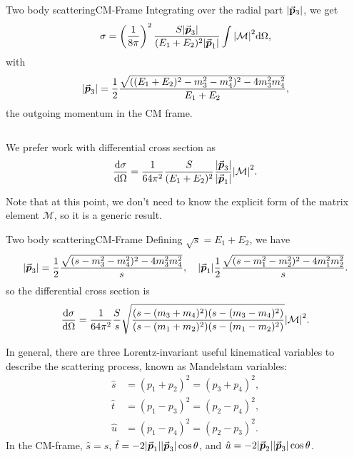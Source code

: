 \documentclass{../bredelebeamer}
\begin{document}
\begin{frame}{Two body scattering}{CM-Frame}
    Integrating over the radial part $\abs{\va p_3}$, we get
    \begin{equation}
        \sigma = \left(\frac{1}{8\pi}\right)^2 \frac{S |\va*{p}_3|}{(E_1 +E_2)^2 \abs{\va*{p}_1}} \int \abs{\mathcal{M}}^2 \dd\Omega,
    \end{equation}
    with 
    \begin{equation}
        |\va*{p}_3| = \frac{1}{2} \frac{\sqrt{((E_1+E_2)^2 - m_3^2 -m_4^2)^2- 4m^2_3m^2_4} }{E_1+E_2},
    \end{equation}
    the outgoing momentum in the CM frame.

    $$ $$

    We prefer work with differential cross section as
    \begin{equation}
        \frac{\dd \sigma}{\dd \Omega} = \frac{1}{64\pi^2} \frac{S }{(E_1 +E_2)^2 } \frac{|\va*{p}_3|}{\abs{\va*{p}_1}} \abs{\mathcal{M}}^2.
    \end{equation}
   

    Note that at this point, we don't need to know the explicit form of the matrix element $\mathcal{M}$, so it is a generic result.
\end{frame}

\begin{frame}{Two body scattering}{CM-Frame}
    Defining $\sqrt s = E_1 + E_2$, we have
    \begin{equation}
        |\va*{p}_3| = \frac{1}{2} \frac{\sqrt{(s - m_3^2 -m_4^2)^2- 4m^2_3m^2_4} }{s}, \quad  |\va*{p}_1|\frac{1}{2} \frac{\sqrt{(s - m_1^2 -m_2^2)^2- 4m^2_1m^2_2} }{s}.
    \end{equation}
    so the differential cross section is
    \begin{equation}
        \frac{\dd \sigma}{\dd \Omega} = \frac{1}{64\pi^2} \frac{S }{s } 
        \sqrt{\frac{(s - (m_3 + m_4)^2)(s - (m_3 - m_4)^2)}{(s - (m_1 + m_2)^2)(s - (m_1 - m_2)^2)}}
        \abs{\mathcal{M}}^2.
    \end{equation}
    
    In general, there are three Lorentz-invariant useful kinematical variables to describe the scattering process, known as Mandelstam variables:
    \begin{align}
        \hat s &= (p_1 + p_2)^2 = (p_3 + p_4)^2,\\
        \hat t &= (p_1 - p_3)^2 = (p_2 - p_4)^2,\\
        \hat u &= (p_1 - p_4)^2 = (p_2 - p_3)^2.
    \end{align}
    In the CM-frame, $\hat s = s$, $\hat t = -2|\va*{p}_1||\va*{p}_3|\cos\theta$, and $\hat u = -2|\va*{p}_2||\va*{p}_3|\cos\theta$.
\end{frame}

\begin{frame}
    
\end{frame}
\end{document}
